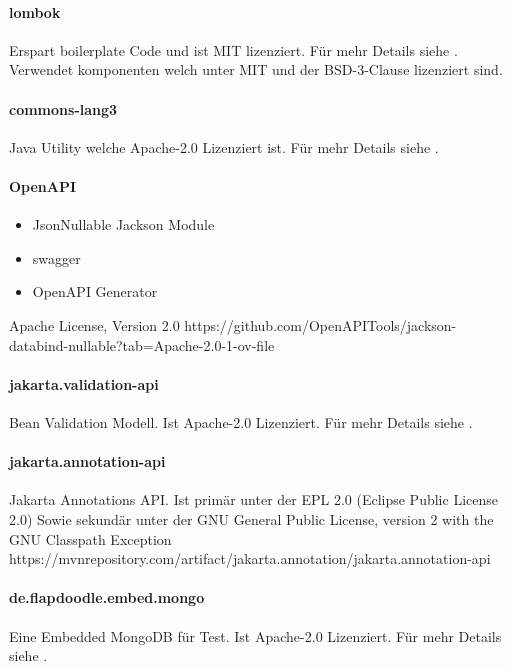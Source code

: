 \paragraph{lombok}
Erspart boilerplate Code und ist MIT lizenziert.
Für mehr Details siehe .\\
Verwendet komponenten welch unter MIT und der BSD-3-Clause lizenziert sind.

\paragraph{commons-lang3}
Java Utility welche Apache-2.0 Lizenziert ist.
Für mehr Details siehe .

\paragraph{OpenAPI}
\begin{itemize}
    \item JsonNullable Jackson Module
    \item swagger
    \item OpenAPI Generator
\end{itemize}
Apache License, Version 2.0
https://github.com/OpenAPITools/jackson-databind-nullable?tab=Apache-2.0-1-ov-file

\paragraph{jakarta.validation-api}
Bean Validation Modell.
Ist Apache-2.0 Lizenziert.
Für mehr Details siehe .

\paragraph{jakarta.annotation-api}
Jakarta Annotations API.
Ist primär unter der EPL 2.0 (Eclipse Public License 2.0)
Sowie sekundär unter der GNU General Public License, version 2 with the GNU Classpath Exception
https://mvnrepository.com/artifact/jakarta.annotation/jakarta.annotation-api

\paragraph{de.flapdoodle.embed.mongo}
Eine Embedded MongoDB für Test.
Ist Apache-2.0 Lizenziert.
Für mehr Details siehe .

